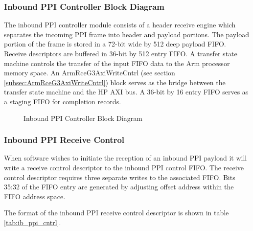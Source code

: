 \documentclass[11pt]{article}
\begin{document}
\subsubsection{Inbound PPI Controller Block Diagram}

The inbound PPI controller module consists of a header receive engine which separates the incoming PPI frame into header and payload portions. The payload
portion of the frame is stored in a 72-bit wide by 512 deep payload FIFO. Receive descriptors are buffered in 36-bit by 512 entry FIFO. A transfer 
state machine controls the transfer of the input FIFO data to the Arm processor memory space. An ArmRceG3AxiWriteCntrl (see section \ref{subsec:ArmRceG3AxiWriteCntrl})
block serves as the bridge between the transfer state machine and the HP AXI bus. A 36-bit by 16 entry FIFO serves as a staging FIFO for completion records. 

\begin{figure}[H]
   \centering
   \caption{Inbound PPI Controller Block Diagram}
   \label{fig:ib_ppi_block}
\end{figure}

\subsubsection{Inbound PPI Receive Control}

When software wishes to initiate the reception of an inbound PPI payload it will write a receive control
descriptor to the inbound PPI control FIFO. The receive control descriptor requires three separate 
writes to the associated FIFO. Bits 35:32 of the FIFO entry are generated by adjusting offset address 
within the FIFO address space.

The format of the inbound PPI receive control descriptor is shown in table \ref{tab:ib_ppi_cntrl}.
\end{document}
